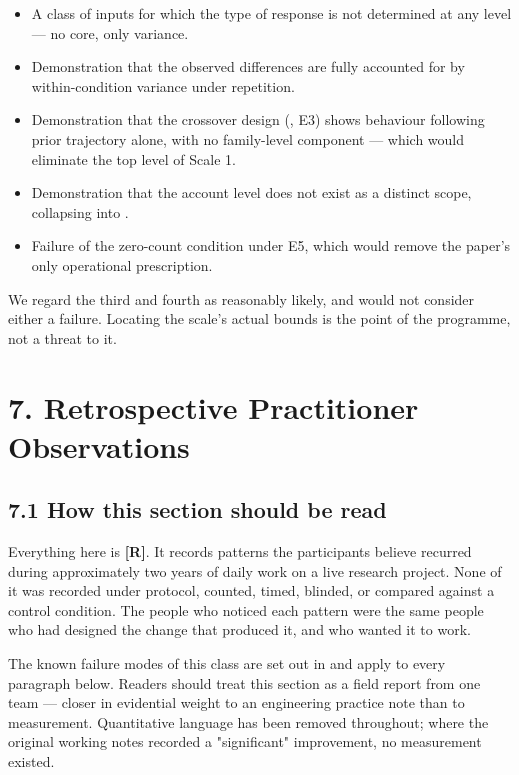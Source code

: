 \begin{itemize}
  \item A class of inputs for which the type of response is not determined at any level — no core, only variance.
  \item Demonstration that the observed differences are fully accounted for by within-condition variance under repetition.
  \item Demonstration that the crossover design (, E3) shows behaviour following prior trajectory alone, with no family-level component — which would eliminate the top level of Scale 1.
  \item Demonstration that the account level does not exist as a distinct scope, collapsing  into .
  \item Failure of the zero-count condition under E5, which would remove the paper's only operational prescription.
\end{itemize}
We regard the third and fourth as reasonably likely, and would not consider either a failure. Locating the scale's actual bounds is the point of the programme, not a threat to it.


\section*{7. Retrospective Practitioner Observations}
\label{sec:en:7}


\subsection*{7.1 How this section should be read}
\label{sec:en:7.1}

Everything here is \textbf{[R]}. It records patterns the participants believe recurred during approximately two years of daily work on a live research project. None of it was recorded under protocol, counted, timed, blinded, or compared against a control condition. The people who noticed each pattern were the same people who had designed the change that produced it, and who wanted it to work.

The known failure modes of this class are set out in  and apply to every paragraph below. Readers should treat this section as a field report from one team — closer in evidential weight to an engineering practice note than to measurement. Quantitative language has been removed throughout; where the original working notes recorded a "significant" improvement, no measurement existed.

